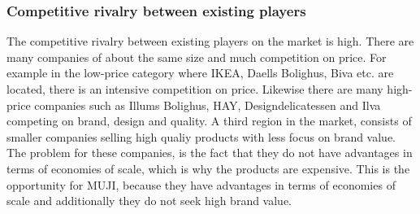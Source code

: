 \subsubsection{Competitive rivalry between existing players}
\label{CompetitionPorters}
The competitive rivalry between existing players on the market is high. There are many companies of about the same size and much competition on price. For example in the low-price category where IKEA, Daells Bolighus, Biva etc. are located, there is an intensive competition on price. Likewise there are many high-price companies such as Illums Bolighus, HAY, Designdelicatessen and Ilva competing on brand, design and quality. A third region in the market, consists of smaller companies selling high qualiy products with less focus on brand value. The problem for these companies, is the fact that they do not have advantages in terms of economies of scale, which is why the products are expensive. This is the opportunity for MUJI, because they have advantages in terms of economies of scale and additionally they do not seek high brand value. 

